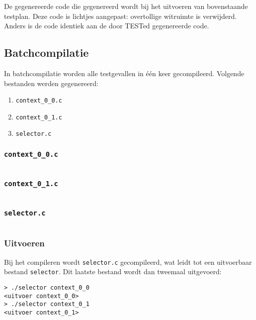 De gegenereerde code die gegenereerd wordt bij het uitvoeren van bovenstaande testplan.
Deze code is lichtjes aangepast: overtollige witruimte is verwijderd.
Anders is de code identiek aan de door TESTed gegenereerde code.

\subsection{Batchcompilatie}\label{subsec:echo-batchcompilatie}

In batchcompilatie worden alle testgevallen in één keer gecompileerd.
Volgende bestanden werden gegenereerd:

\begin{enumerate}
    \item \texttt{context\_0\_0.c}
    \item \texttt{context\_0\_1.c}
    \item \texttt{selector.c}
\end{enumerate}

\subsubsection{\texttt{context\_0\_0.c}}

\inputminted{c}{code/echo-c/context_0_0.c}

\subsubsection{\texttt{context\_0\_1.c}}

\inputminted{c}{code/echo-c/context_0_1.c}

\subsubsection{\texttt{selector.c}}

\inputminted{c}{code/echo-c/selector.c}

\subsubsection{Uitvoeren}

Bij het compileren wordt \texttt{selector.c} gecompileerd, wat leidt tot een uitvoerbaar bestand \texttt{selector}.
Dit laatste bestand wordt dan tweemaal uitgevoerd:

\begin{verbatim}
> ./selector context_0_0
<uitvoer context_0_0>
> ./selector context_0_1
<uitvoer context_0_1>    
\end{verbatim}

